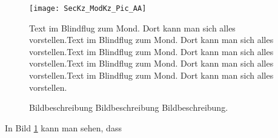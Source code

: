 \documentclass[a4paper, 12pt, xcolor=dvipsnames]{scrartcl}	%
\begin{document}
\begin{figure}[h!]
    	\begin{minipage}{0.6\textwidth}
		\begin {center}
		\vspace{0.0cm}
		\centering
		\hspace{-1.0cm}\texttt{[image: SecKz\_ModKz\_Pic\_AA]}		
		\end {center}
    \end{minipage}%
    \begin{minipage}{0.4\textwidth}
		\linespread {1.25}
		Text im Blindflug zum Mond. Dort kann man sich alles vorstellen.Text im Blindflug zum Mond. Dort kann man sich alles vorstellen.Text im Blindflug zum Mond. Dort kann man sich alles vorstellen.Text im Blindflug zum Mond. Dort kann man sich alles vorstellen.Text im Blindflug zum Mond. Dort kann man sich alles vorstellen.\\
     		\caption{Bildbeschreibung Bildbeschreibung Bildbeschreibung.}
		\label{fig:SecKz_ModKz_Pic_AAb}
    \end{minipage}
\end{figure}
In Bild \ref{fig:SecKz_ModKz_Pic_AAb} kann man sehen, dass \Blindtext \lipsum[1-1]	%
%
\newpage																			%
%
\end{document}
